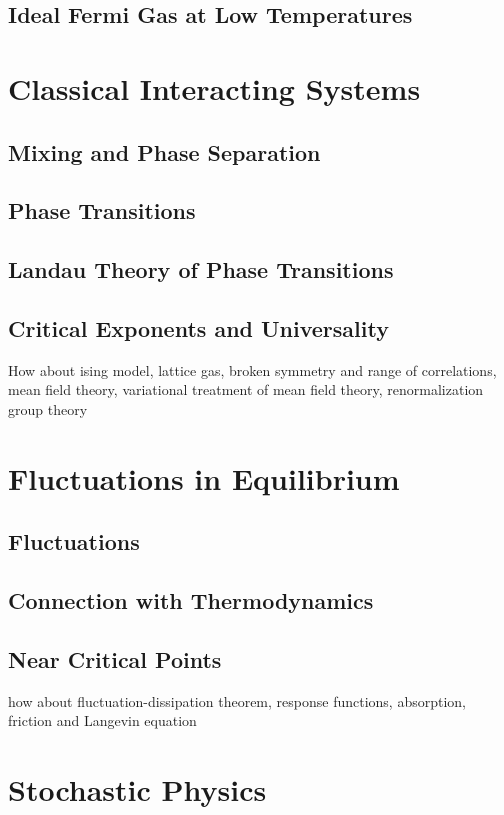 \documentclass[a4paper]{article}
\theoremstyle{new}
\begin{document}
\subsection{Ideal Fermi Gas at Low Temperatures}

\newpage
\section{Classical Interacting Systems}
\subsection{Mixing and Phase Separation}
\subsection{Phase Transitions}
\subsection{Landau Theory of Phase Transitions}
\subsection{Critical Exponents and Universality}
How about ising model, lattice gas, broken symmetry and range of correlations, mean field theory, variational treatment of mean field theory, renormalization group theory


\newpage
\section{Fluctuations in Equilibrium}
\subsection{Fluctuations}
\subsection{Connection with Thermodynamics}
\subsection{Near Critical Points}

how about fluctuation-dissipation theorem, response functions, absorption, friction and Langevin equation

\newpage
\section{Stochastic Physics}
\end{document}
